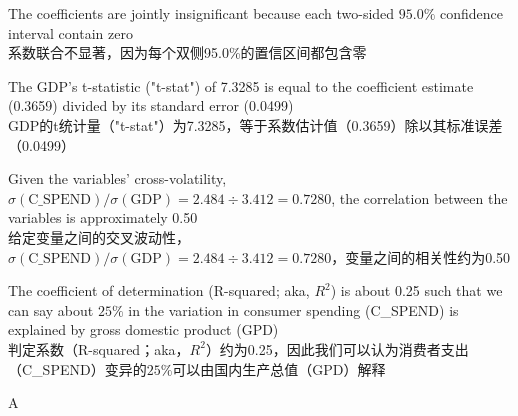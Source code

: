 \documentclass{article}
\begin{document}
\begin{choices}
    \item The coefficients are jointly insignificant because each two-sided $95.0\%$ confidence interval contain zero
    \\系数联合不显著，因为每个双侧95.0\%的置信区间都包含零
    \item The GDP's t-statistic ("t-stat") of 7.3285 is equal to the coefficient estimate (0.3659) divided by its standard error (0.0499)
    \\GDP的t统计量（"t-stat"）为7.3285，等于系数估计值（0.3659）除以其标准误差（0.0499）
    \item Given the variables' cross-volatility, $\sigma(\text{C\_SPEND})/\sigma(\text{GDP}) = 2.484 \div 3.412 = 0.7280$, the correlation between the variables is approximately 0.50
    \\给定变量之间的交叉波动性，$\sigma(\text{C\_SPEND})/\sigma(\text{GDP}) = 2.484 \div 3.412 = 0.7280$，变量之间的相关性约为0.50
    \item The coefficient of determination (R-squared; aka, $R^2$) is about 0.25 such that we can say about $25\%$ in the variation in consumer spending (C\_SPEND) is explained by gross domestic product (GPD)
    \\判定系数（R-squared；aka，$R^2$）约为0.25，因此我们可以认为消费者支出（C\_SPEND）变异的$25\%$可以由国内生产总值（GPD）解释
\end{choices}

\begin{correctanswer}
A
\end{correctanswer}
\end{document}

